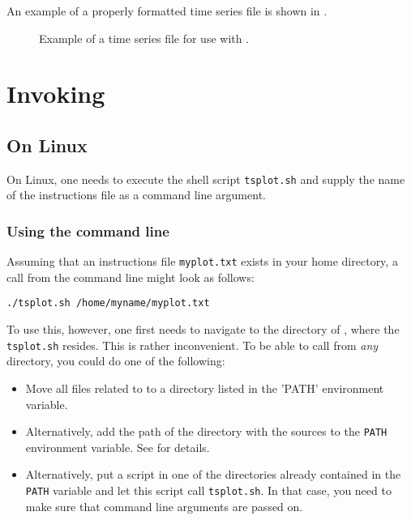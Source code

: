 An example of a properly formatted time series file is shown in .

\begin{figure}
  
  \caption{Example of a time series file for use with . \label{fig:tsplot:tseries-example}}
\end{figure}

\section{Invoking } \label{sec:tsplot:invoke}

\subsection{On Linux} \label{sec:tsplot:invoke-linux}

On Linux, one needs to execute the shell script \texttt{tsplot.sh} and supply the name of the instructions file as a command line argument.

\subsubsection*{Using the command line}
Assuming that an instructions file \texttt{myplot.txt} exists in your home directory, a call from the command line might look as follows:

\begin{lstlisting}[style=shell]
  ./tsplot.sh /home/myname/myplot.txt
\end{lstlisting}

To use this, however, one first needs to navigate to the directory of , where the \texttt{tsplot.sh} resides. This is rather inconvenient. To be able to call  from \emph{any} directory, you could do one of the following:

\begin{itemize}
  \item Move all files related to  to a directory listed in the 'PATH' environment variable.
  \item Alternatively, add the path of the directory with the  sources to the \verb!PATH! environment variable. See \citet{Echse-Install-Doc} for details.
  \item Alternatively, put a script in one of the directories already contained in the \verb!PATH! variable and let this script call \texttt{tsplot.sh}. In that case, you need to make sure that command line arguments are passed on.
\end{itemize}

